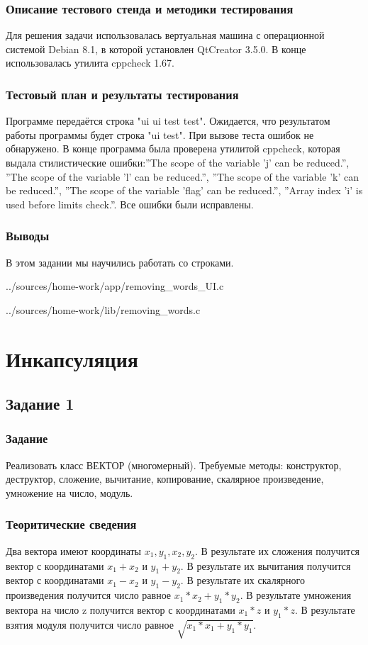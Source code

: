 \documentclass[12pt,a4paper]{report}
\begin{document}
\subsection{Описание тестового стенда и методики тестирования}
Для решения задачи использовалась вертуальная машина с операционной системой Debian 8.1, в которой установлен QtCreator 3.5.0. В конце использовалась утилита cppcheck 1.67.
\subsection{Тестовый план и результаты тестирования}
Программе передаётся строка "ui ui test test". Ожидается, что результатом работы программы будет строка "ui test". При вызове теста ошибок не обнаружено. В конце программа была проверена утилитой cppcheck, которая выдала стилистические ошибки:''The scope of the variable 'j' can be reduced.'', ''The scope of the variable 'l' can be reduced.'', ''The scope of the variable 'k' can be reduced.'', ''The scope of the variable 'flag' can be reduced.'', ''Array index 'i' is used before limits check.''. Все ошибки были исправлены.
\subsection{Выводы}
В этом задании мы научились работать со строками.

{../sources/home-work/app/removing_words_UI.c}


{../sources/home-work/lib/removing_words.c}
\chapter{Инкапсуляция}
\section{Задание 1}
\subsection{Задание}
Реализовать класс ВЕКТОР (многомерный). Требуемые методы: конструктор, деструктор, сложение, вычитание, копирование, скалярное произведение, умножение на число, модуль.
\subsection{Теоритические сведения}
Два вектора имеют координаты $ x_1, y_1, x_2, y_2 $. В результате их сложения получится вектор с координатами $ x_1+x_2 $ и $ y_1+y_2 $. В результате их вычитания получится вектор с координатами $ x_1-x_2 $ и $ y_1-y_2 $. В результате их скалярного произведения получится число равное $ x_1 * x_2 + y_1 * y_2 $. В результате умножения вектора на число z получится вектор с координатами $ x_1*z $ и $ y_1*z $. В результате взятия модуля получится число равное $ \sqrt{x_1*x_1+y_1*y_1} $. 
\end{document}
